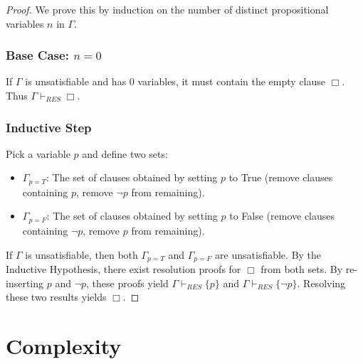 \documentclass{article}
\begin{document}
\begin{proof}
    We prove this by induction on the number of distinct propositional variables $n$ in $\Gamma$.
    
    \subsubsection*{Base Case: $n=0$}
    If $\Gamma$ is unsatisfiable and has 0 variables, it must contain the empty clause $\Box$. Thus $\Gamma \vdash_{RES} \Box$.

    \subsubsection*{Inductive Step}
    Pick a variable $p$ and define two sets:
    \begin{itemize}
        \item $\Gamma_{p=T}$: The set of clauses obtained by setting $p$ to True (remove clauses containing $p$, remove $\neg p$ from remaining).
        \item $\Gamma_{p=F}$: The set of clauses obtained by setting $p$ to False (remove clauses containing $\neg p$, remove $p$ from remaining).
    \end{itemize}
    If $\Gamma$ is unsatisfiable, then both $\Gamma_{p=T}$ and $\Gamma_{p=F}$ are unsatisfiable. By the Inductive Hypothesis, there exist resolution proofs for $\Box$ from both sets. By re-inserting $p$ and $\neg p$, these proofs yield $\Gamma \vdash_{RES} \{p\}$ and $\Gamma \vdash_{RES} \{\neg p\}$. Resolving these two results yields $\Box$.
\end{proof}
\section{Complexity}
\end{document}
